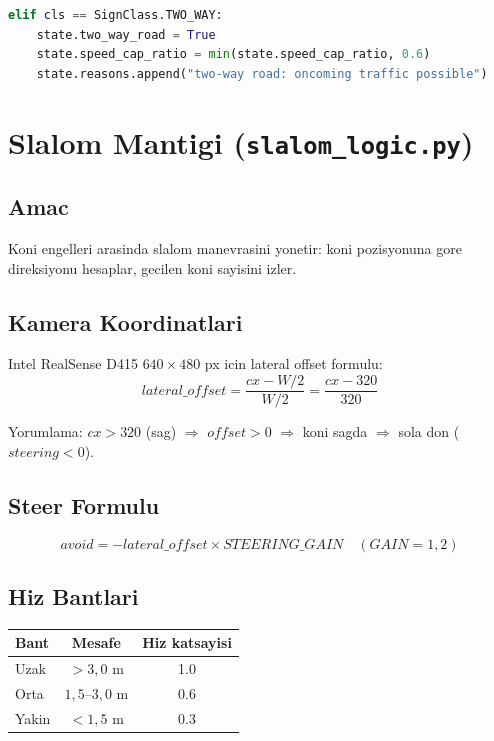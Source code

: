\documentclass[a4paper,12pt]{article}
\begin{document}
\begin{lstlisting}[language=Python]
elif cls == SignClass.TWO_WAY:
    state.two_way_road = True
    state.speed_cap_ratio = min(state.speed_cap_ratio, 0.6)
    state.reasons.append("two-way road: oncoming traffic possible")
\end{lstlisting}

\section{Slalom Mantigi (\texttt{slalom\_logic.py})}

\subsection{Amac}

Koni engelleri arasinda slalom manevrasini yonetir: koni pozisyonuna gore
direksiyonu hesaplar, gecilen koni sayisini izler.

\subsection{Kamera Koordinatlari}

Intel RealSense D415 $640 \times 480$ px icin lateral offset formulu:
\begin{equation}
  lateral\_offset = \frac{cx - W/2}{W/2}
  = \frac{cx - 320}{320}
\end{equation}

Yorumlama: $cx > 320$ (sag) $\Rightarrow$ $offset > 0$ $\Rightarrow$ koni sagda
$\Rightarrow$ sola don ($steering < 0$).

\subsection{Steer Formulu}

\begin{equation}
  avoid = -lateral\_offset \times STEERING\_GAIN \quad (GAIN = 1{,}2)
\end{equation}

\subsection{Hiz Bantlari}

\begin{center}
\begin{tabular}{lcc}
  \toprule
  Bant  & Mesafe        & Hiz katsayisi\\
  \midrule
  Uzak  & $> 3{,}0$ m   & 1.0\\
  Orta  & $1{,}5$--$3{,}0$ m & 0.6\\
  Yakin & $< 1{,}5$ m   & 0.3\\
  \bottomrule
\end{tabular}
\end{center}
\end{document}
